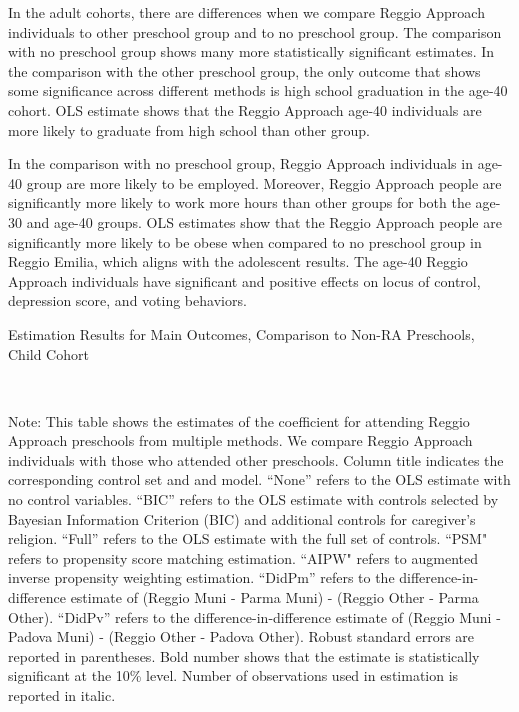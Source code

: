 In the adult cohorts, there are differences when we compare Reggio Approach individuals to other preschool group and to no preschool group. The comparison with no preschool group shows many more statistically significant estimates. In the comparison with the other preschool group, the only outcome that shows some significance across different methods is high school graduation in the age-40 cohort. OLS estimate shows that the Reggio Approach age-40 individuals are more likely to graduate from high school than other group. 

In the comparison with no preschool group, Reggio Approach individuals in age-40 group are more likely to be employed. Moreover, Reggio Approach people are significantly more likely to work more hours than other groups for both the age-30 and age-40 groups. OLS estimates show that the Reggio Approach people are significantly more likely to be obese when compared to no preschool group in Reggio Emilia, which aligns with the adolescent results. The age-40 Reggio Approach individuals have significant and positive effects on locus of control, depression score, and voting behaviors. 



\begin{table}[H] \caption{Estimation Results for Main Outcomes, Comparison to Non-RA Preschools, Child Cohort} \label{ols-M-child-reg-pres}
\scalebox{0.8}{}
\vspace{1ex} \\
\footnotesize\raggedright{Note: This table shows the estimates of the coefficient for attending Reggio Approach preschools from multiple methods. We compare Reggio Approach individuals with those who attended other preschools. Column title indicates the corresponding control set and and model. ``None'' refers to the OLS estimate with no control variables. ``BIC'' refers to the OLS estimate with controls selected by Bayesian Information Criterion (BIC) and additional controls for caregiver's religion. ``Full'' refers to the OLS estimate with the full set of controls. ``PSM" refers to propensity score matching estimation. ``AIPW" refers to augmented inverse propensity weighting estimation. ``DidPm'' refers to the difference-in-difference estimate of (Reggio Muni - Parma Muni) - (Reggio Other - Parma Other). ``DidPv'' refers to the difference-in-difference estimate of (Reggio Muni - Padova Muni) - (Reggio Other - Padova Other). Robust standard errors are reported in parentheses. Bold number shows that the estimate is statistically significant at the 10\% level. Number of observations used in estimation is reported in italic.}

\end{table}


